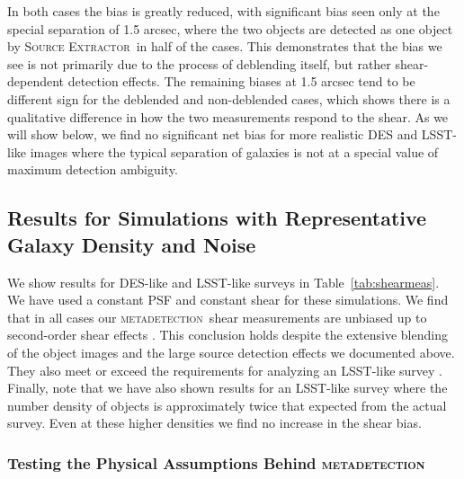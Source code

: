 \documentclass[iop, appendixfloats, numberedappendix, apj]{emulateapj}
\newcommand{\mdet}{\textsc{metadetection}}
\newcommand{\sx}{\textsc{Source Extractor}}
\begin{document}
In both cases the bias is greatly reduced, with significant bias seen only at
the special separation of 1.5 arcsec, where the two objects are detected as one
object by \sx\ in half of the cases. This demonstrates that the bias we see is
not primarily due to the process of deblending itself, but rather
shear-dependent detection effects. The remaining biases at 1.5 arcsec tend to
be different sign for the deblended and non-deblended cases, which shows there
is a qualitative difference in how the two measurements respond to the shear.
As we will show below, we find no significant net bias for more realistic DES
and LSST-like images where the typical separation of galaxies is not at a
special value of maximum detection ambiguity.

\subsection{Results for Simulations with Representative Galaxy Density and Noise}
\label{sec:res:constpsf}

We show results for DES-like and LSST-like surveys in Table~\ref{tab:shearmeas}.
We have used a constant PSF and constant shear for these simulations. We find
that in all cases our \mdet\ shear measurements are unbiased up to
second-order shear effects \citep[we expect a bias of a few parts in 10000 for shears
of 0.02, see][]{SheldonMcal2017}. This conclusion holds despite the extensive blending
of the object images and the large source detection effects we documented
above. They also meet or exceed the requirements for analyzing an LSST-like survey
\citep[e.g.,][]{huterer2006}. Finally, note that we have also shown results for an
LSST-like survey where the number density of objects is approximately twice that
expected from the actual survey.  Even at these higher densities we find
no increase in the shear bias.

\subsubsection{Testing the Physical Assumptions Behind \mdet}
\label{sec:mdetphys}
\end{document}
